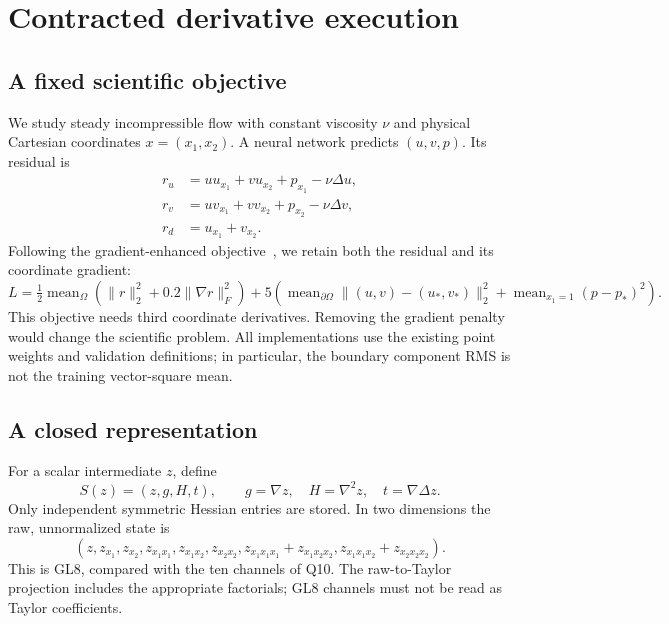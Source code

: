 \documentclass[11pt]{article}
\begin{document}
\section{Contracted derivative execution}
\subsection{A fixed scientific objective}
We study steady incompressible flow with constant viscosity $\nu$ and physical
Cartesian coordinates $x=(x_1,x_2)$. A neural network predicts $(u,v,p)$.
Its residual is
\begin{align}
r_u&=u u_{x_1}+v u_{x_2}+p_{x_1}-\nu\Delta u,\\
r_v&=u v_{x_1}+v v_{x_2}+p_{x_2}-\nu\Delta v,\\
r_d&=u_{x_1}+v_{x_2}.
\end{align}
Following the gradient-enhanced objective~\cite{gpinn}, we retain both the
residual and its coordinate gradient:
\begin{equation}
L=\tfrac12\operatorname{mean}_{\Omega}
\left(\|r\|_2^2+0.2\|\nabla r\|_F^2\right)
+5\left(\operatorname{mean}_{\partial\Omega}
\|(u,v)-(u_*,v_*)\|_2^2+
\operatorname{mean}_{x_1=1}(p-p_*)^2\right).
\end{equation}
This objective needs third coordinate derivatives. Removing the gradient
penalty would change the scientific problem. All implementations use the
existing point weights and validation definitions; in particular, the
boundary component RMS is not the training vector-square mean.

\subsection{A closed representation}
For a scalar intermediate $z$, define
\begin{equation}
S(z)=(z,g,H,t),\qquad g=\nabla z,\quad
H=\nabla^2 z,\quad t=\nabla\Delta z.
\end{equation}
Only independent symmetric Hessian entries are stored. In two dimensions
the raw, unnormalized state is
\begin{equation}
(z,z_{x_1},z_{x_2},z_{x_1x_1},z_{x_1x_2},z_{x_2x_2},
 z_{x_1x_1x_1}+z_{x_1x_2x_2},
 z_{x_1x_1x_2}+z_{x_2x_2x_2}).
\end{equation}
This is GL8, compared with the ten channels of Q10. The raw-to-Taylor
projection includes the appropriate factorials; GL8 channels must not be
read as Taylor coefficients.
\end{document}
